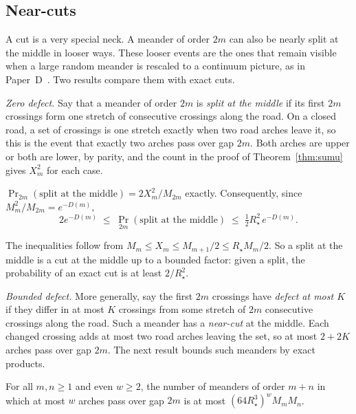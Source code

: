 \subsection{Near-cuts}\label{sec:nearcuts}

A cut is a very special neck. A meander of order $2m$ can also be nearly split at the middle in looser
ways. These looser events are the ones that remain visible when a large random meander is rescaled
to a continuum picture, as in Paper~D~\cite{PaperD}. Two results compare them with exact cuts.

\emph{Zero defect.} Say that a meander of order $2m$ is \emph{split at the middle} if its first $2m$
crossings form one stretch of consecutive crossings along the road. On a closed road, a set of
crossings is one stretch exactly when two road arches leave it, so this is the event that exactly two
arches pass over gap $2m$. Both arches are upper or both are lower, by parity, and the count in the
proof of Theorem~\ref{thm:sumu} gives $X_m^2$ for each case.

\begin{proposition}\label{prop:zerodefect}
$\Pr_{2m}(\text{split at the middle})=2X_m^2/M_{2m}$ exactly. Consequently, since
$M_m^2/M_{2m}=e^{-D(m)}$,
\[ 2e^{-D(m)}\;\le\;\Pr_{2m}(\text{split at the middle})\;\le\;\tfrac12R_\star^2\,e^{-D(m)} . \]
\end{proposition}

The inequalities follow from $M_m\le X_m\le M_{m+1}/2\le R_\star M_m/2$. So a split at the middle is a cut
at the middle up to a bounded factor: given a split, the probability of an exact cut is at least
$2/R_\star^2$.

\emph{Bounded defect.} More generally, say the first $2m$ crossings have \emph{defect at most $K$} if
they differ in at most $K$ crossings from some stretch of $2m$ consecutive crossings along the road.
Such a meander has a \emph{near-cut} at the middle.
Each changed crossing adds at most two road arches leaving the set, so at most $2+2K$ arches pass over
gap $2m$. The next result bounds such meanders by exact products.

\begin{proposition}\label{prop:linrec}
For all $m,n\ge1$ and even $w\ge2$, the number of meanders of order $m+n$ in which at most $w$ arches
pass over gap $2m$ is at most $(64R_\star^3)^w M_mM_n$.
\end{proposition}

